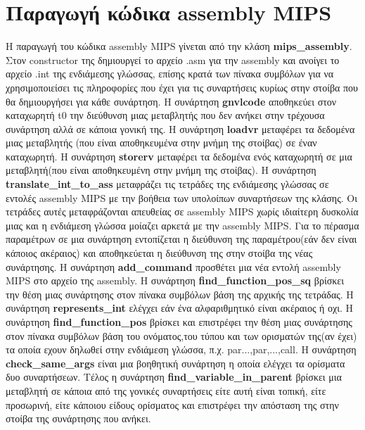 \documentclass[12pt,a4paper,a4paper]{report}
\begin{document}
\chapter{Παραγωγή κώδικα assembly MIPS}
Η παραγωγή του κώδικα assembly MIPS γίνεται από την κλάση \textbf{mips\_assembly}. Στον constructor της δημιουργεί το αρχείο .asm για την assembly και ανοίγει το αρχείο .int της ενδιάμεσης γλώσσας, επίσης κρατά των πίνακα συμβόλων για να χρησιμοποιείσει τις πληροφορίες που έχει για τις συναρτήσεις κυρίως στην στοίβα που θα δημιουργήσει για κάθε συνάρτηση. Η συνάρτηση \textbf{gnvlcode}  αποθηκεύει στον καταχωρητή t0 την διεύθυνση μιας μεταβλητής που δεν ανήκει στην τρέχουσα συνάρτηση αλλά σε κάποια γονική της. Η συνάρτηση \textbf{loadvr} μεταφέρει τα δεδομένα μιας μεταβλητής (που είναι αποθηκευμένα στην μνήμη της στοίβας) σε έναν καταχωρητή. Η συνάρτηση \textbf{storerv} μεταφέρει τα δεδομένα ενός καταχωρητή σε μια μεταβλητή(που είναι αποθηκευμένη στην μνήμη της στοίβας). Η συνάρτηση \textbf{translate\_int\_to\_ass} μεταφράζει τις τετράδες της ενδιάμεσης γλώσσας σε εντολές assembly MIPS με την βοήθεια των υπολοίπων συναρτήσεων της κλάσης. Οι τετράδες αυτές μεταφράζονται απευθείας σε assembly MIPS χωρίς ιδιαίτερη δυσκολία μιας και η ενδιάμεση γλώσσα μοίαζει αρκετά με την assembly MIPS. Για το πέρασμα παραμέτρων σε μια συνάρτηση εντοπίζεται η διεύθυνση της παραμέτρου(εάν δεν είναι κάποιος ακέραιος) και αποθηκεύεται η διεύθυνση της στην στοίβα της νέας συνάρτησης. Η συνάρτηση \textbf{add\_command} προσθέτει μια νέα εντολή assembly MIPS στο αρχείο της assembly. H συνάρτηση \textbf{find\_function\_pos\_sq} βρίσκει την θέση μιας συνάρτησης στον πίνακα συμβόλων βάση της αρχικής της τετράδας. Η συνάρτηση \textbf{represents\_int} ελέγχει εάν ένα αλφαριθμητικό είναι ακέραιος ή οχι. Η συνάρτηση \textbf{find\_function\_pos}  βρίσκει και επιστρέφει την θέση μιας συνάρτησης στον πίνακα συμβόλων βάση του ονόματος,του τύπου και των ορισματών της(αν έχει) τα οποία εχουν δηλωθεί στην ενδιάμεση γλώσσα, π.χ. par...,par,...,call. H συνάρτηση \textbf{check\_same\_args} είναι μια βοηθητική συνάρτηση η οποία ελέγχει τα ορίσματα δυο συναρτήσεων. Tέλος η συνάρτηση \textbf{find\_variable\_in\_parent} βρίσκει μια μεταβλητή σε κάποια από της γονικές συναρτήσεις είτε αυτή είναι τοπική, είτε προσωρινή, είτε κάποιου είδους ορίσματος και επιστρέφει την απόσταση της στην στοίβα της συνάρτησης που ανήκει.
\end{document}
